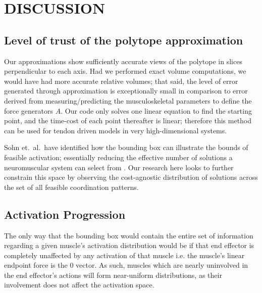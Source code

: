 \section{DISCUSSION}

\subsection{Level of trust of the polytope approximation} %
\label{sub:level_of_trust_of_the_polytope_approximation}

Our approximations show sufficiently accurate views of the polytope in slices perpendicular to each axis. Had we performed exact volume computations, we would have had more accurate relative volumes; that said, the level of error generated through approximation is exceptionally small in comparison to error derived from measuring/predicting the musculoskeletal parameters to define the force generators $A$. Our code only solves one linear equation to find the starting point, and the time-cost of each point thereafter is linear; therefore this method can be used for tendon driven models in very high-dimensional systems.

Sohn et.\ al.\ have identified how the bounding box can illustrate the bounds of feasible activation; essentially reducing the effective number of solutions a neuromuscular system can select from \cite{sohn2013cat_bounding_box}. Our research here looks to further constrain this space by observing the cost-agnostic distribution of solutions across the set of all feasible coordination patterns.

\subsection{Activation Progression} %
\label{sub:activation_progression}
The only way that the bounding box would contain the entire set of information regarding a given muscle's activation distribution would be if that end effector is completely unaffected by any activation of that muscle i.e. the muscle's linear endpoint force is the 0 vector. As such, muscles which are nearly uninvolved in the end effector's actions will form near-uniform distributions, as their involvement does not affect the activation space.


